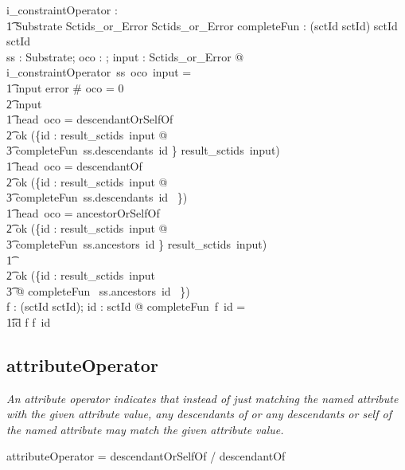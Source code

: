 \documentclass{article}
\def\bnf#1{{\scriptsize {{#1}} }}
\def\desc#1{{\small \textsl{{#1}} }}
\begin{document}
\begin{axdef}
   i\_constraintOperator : \\
\t1 Substrate \fun \optional[constraintOperator] \fun Sctids\_or\_Error \fun Sctids\_or\_Error
\also
   completeFun : (sctId \pfun \power sctId) \fun sctId \fun \power sctId \\
\where
	\forall ss : Substrate; oco : \optional[constraintOperator]; input : Sctids\_or\_Error @ \\
i\_constraintOperator~ss~oco~input = \\
\t1 \IF input \in \ran error  \lor \# oco = 0  \THEN  \\
\t2 input \\
\t1 \ELSE \IF head~oco = descendantOrSelfOf \THEN \\
\t2 ok (\bigcup \{id : result\_sctids~input @ \\
\t3 completeFun~ss.descendants~id \} \cup result\_sctids~input) \\
\t1 \ELSE \IF head~oco = descendantOf~ \THEN \\
\t2 ok  (\bigcup \{id : result\_sctids~input @ \\
\t3 completeFun~ss.descendants~id ~\}) \\
\t1 \ELSE \IF head~oco = ancestorOrSelfOf~ \THEN  \\
\t2 ok (\bigcup \{id : result\_sctids~input @ \\
\t3 completeFun~ss.ancestors~id \} \cup result\_sctids~input) \\
\t1 \ELSE  \\
\t2 ok (\bigcup \{id : result\_sctids~input \\
\t3 @ completeFun~ ss.ancestors~id ~\}) \\
\also
   \forall f : (sctId \pfun \power sctId); id : sctId @ completeFun~f~id = \\
\t1\IF id \in \dom f \THEN f~id \ELSE \emptyset 
\end{axdef}

\subsection{attributeOperator}
\begin{framed}
\desc{An attribute operator indicates that instead of just matching the named attribute with the given attribute value, any descendants of or any descendants or self of the named attribute may match the given attribute value.}
\end{framed}
\begin{framed}
\bnf{attributeOperator = descendantOrSelfOf / descendantOf}
\end{framed}
\end{document}

